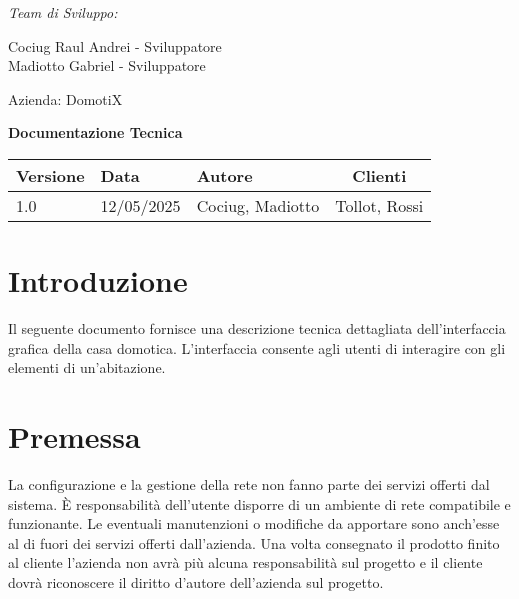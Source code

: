\documentclass[a4paper,12pt]{article}
\begin{document}
\begin{titlepage}
    \begin{minipage}[t]{0.4\textwidth}
    \raggedright
    {\large\itshape Team di Sviluppo:\par}
    \vspace{0.2cm}
    
    Cociug Raul Andrei - Sviluppatore \\
    Madiotto Gabriel - Sviluppatore
    \end{minipage}
    \hfill
    \begin{minipage}[t]{0.4\textwidth}
    \raggedleft
    {\Large Azienda: DomotiX\par}
    \end{minipage}
    
    \centering
    \vspace*{5cm}
    
    {\Huge\bfseries Documentazione Tecnica\par}
    
    \vfill
    
    \begin{table}[h]
    \centering
    \begin{tabular}{@{}lllc@{}}
    \toprule
    Versione & Data & Autore & Clienti \\  
    \midrule
    1.0 & 12/05/2025 & Cociug, Madiotto & Tollot, Rossi \\
    \bottomrule
    \end{tabular}
    \end{table}
    
    \thispagestyle{empty}
\end{titlepage}

\tableofcontents
\newpage

\section{Introduzione}

Il seguente documento fornisce una descrizione tecnica dettagliata dell'interfaccia grafica della casa domotica. L’interfaccia consente agli utenti di interagire con gli elementi di un’abitazione.

\section{Premessa}

La configurazione e la gestione della rete non fanno parte dei servizi offerti
dal sistema. È responsabilità dell’utente disporre di un ambiente di rete compatibile e funzionante. Le eventuali manutenzioni o modifiche da apportare sono anch'esse al di fuori dei servizi offerti dall'azienda. Una volta consegnato il prodotto finito al cliente l'azienda non avrà più alcuna responsabilità sul progetto e il cliente dovrà riconoscere il diritto d'autore dell'azienda sul progetto.
\end{document}
